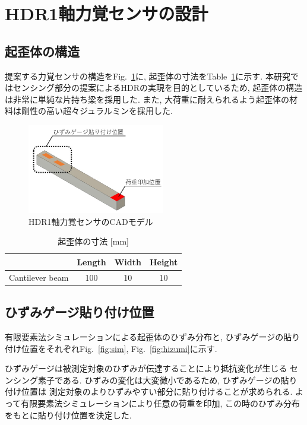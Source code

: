 \section{HDR1軸力覚センサの設計}
\subsection{起歪体の構造}
提案する力覚センサの構造をFig.~\ref{fig:sensor}に, 
起歪体の寸法をTable~\ref{tb:size}に示す.
本研究ではセンシング部分の提案によるHDRの実現を目的としているため, 
起歪体の構造は非常に単純な片持ち梁を採用した. 
また, 大荷重に耐えられるよう起歪体の材料は剛性の高い超々ジュラルミンを採用した. 

\begin{figure}[b]
  \begin{center}
    \includegraphics[width=6.0cm]{pic/hari.jpg}
    \caption{HDR1軸力覚センサのCADモデル}\label{fig:sensor}
  \end{center}
\end{figure}

\begin{table}[h]
  \caption{起歪体の寸法 [mm]}\label{tb:size}
  \begin{center}
   \begin{tabular}{ c c c c }
    \hline
     & Length & Width & Height  \\
    \hline
    Cantilever beam & 100 & 10 & 10  \\
    \hline   
   \end{tabular}
  \end{center}
 \end{table}

\subsection{ひずみゲージ貼り付け位置}
有限要素法シミュレーションによる起歪体のひずみ分布と, 
ひずみゲージの貼り付け位置をそれぞれFig.~\ref{fig:sim}, 
Fig.~\ref{fig:hizumi}に示す. 

ひずみゲージは被測定対象のひずみが伝達することにより抵抗変化が生じる
センシング素子である. 
ひずみの変化は大変微小であるため, ひずみゲージの貼り付け位置は
測定対象のよりひずみやすい部分に貼り付けることが求められる. 
よって有限要素法シミュレーションにより任意の荷重を印加, 
この時のひずみ分布をもとに貼り付け位置を決定した. 


